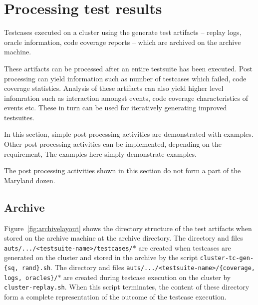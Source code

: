 %
%
\section{Processing test results}
\label{sec:process}

Testcases executed on a cluster using the \mddozen{} generate test artifacts -- replay logs, oracle information, code coverage reports -- which are archived on the archive machine.

These artifacts can be processed after an entire testsuite has been executed. Post processing can yield information such as number of testcases which failed, code coverage statistics. Analysis of these artifacts can also yield higher level infomration such as interaction amongst events, code coverage characteristics of events etc. These in turn can be used for iteratively generating improved testsuites.

In this section, simple post processing activities are demonstrated with examples. Other post processing activities can be implemented, depending on the requirement, The examples here simply demonstrate examples.

The post processing activities shown in this section do not form a part of the Maryland dozen.

\subsection{Archive}
\label{sec:archive}

Figure~\ref{fig:archivelayout} shows the directory structure of the test artifacts when stored on the archive machine at the archive directory. The directory and files \texttt{auts/.../<testsuite-name>/testcases/$*$} are created when testcases are generated on the cluster and stored in the archive by the script \texttt{cluster-tc-gen-\{sq, rand\}.sh}. The directory and files \texttt{auts/.../<testsuite-name>/\{coverage, logs, oracles\}/$*$} are created during testcase execution on the cluster by \texttt{cluster-replay.sh}. When this script terminates, the content of these directory form a complete representation of the outcome of the testcase execution.

